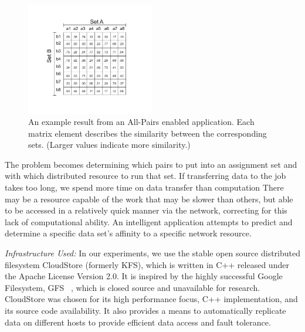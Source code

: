 \documentclass{rspublic}
\newcommand{\micnote}[1]{ {\textcolor{blue} { ***Michael: #1 }}}
\newcommand{\betynote}[1]{ {\textcolor{orange} { ***Bety: #1 }}}
\newcommand{\jhanote}[1]{} \newcommand{\micnote}[1]{}\newcommand{\betynote}[1]{} \newcommand{\fixme}[1]{}
\begin{document}
\begin{figure}[!ht]
 \begin{center}
     \includegraphics[width=0.50\textwidth]{data/allpairs-exp.pdf}
\end{center}
\caption{\small An example result from an All-Pairs enabled application.
Each matrix element describes the similarity between the corresponding
sets. (Larger values indicate more similarity.)}
 \label{Fig:AllPairsExplanation}
\end{figure}

The problem becomes determining which pairs to put into an assignment
set and with which distributed resource to run that set.  \jhanote{The
  following should be shortened} If transferring data to the job takes
too long, we spend more time on data transfer than computation There
may be a resource capable of the work that may be slower than others,
but able to be accessed in a relatively quick manner via the network,
correcting for this lack of computational ability. An intelligent
application attempts to predict and determine a specific data set's
affinity to a specific network resource.


{\it Infrastructure Used: } In our experiments, we use the stable open source distributed
filesystem CloudStore (formerly KFS), which is written in C++ released
under the Apache License Version 2.0. It is inspired by the highly
successful Google Filesystem, GFS ~\citep{cloudstore_web}, which is
closed source and unavailable for research. CloudStore was chosen for
its high performance focus, C++ implementation, and its source code
availability. It also provides a means to automatically replicate data
on different hosts to provide efficient data access and fault
tolerance.
\end{document}
